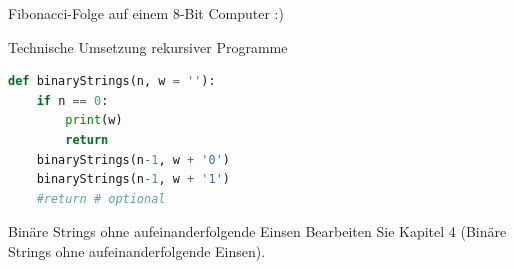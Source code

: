 \begin{frame}[fragile]{Fibonacci-Folge auf einem 8-Bit Computer :)}
\end{frame}

\begin{frame}[fragile]{Technische Umsetzung rekursiver Programme}
\begin{lstlisting}[language=Python]
def binaryStrings(n, w = ''):
    if n == 0:
        print(w)
        return
    binaryStrings(n-1, w + '0')
    binaryStrings(n-1, w + '1')
    #return # optional
\end{lstlisting}
\end{frame}

\begin{frame}[fragile]{Binäre Strings ohne aufeinanderfolgende Einsen}
Bearbeiten Sie Kapitel 4 (Binäre Strings ohne
aufeinanderfolgende Einsen).
\end{frame}